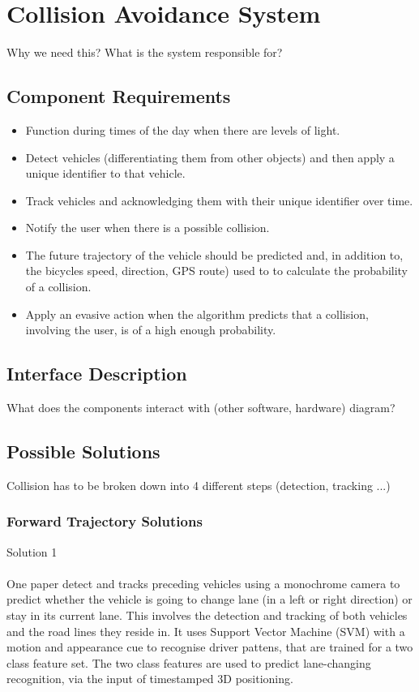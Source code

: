\documentclass[]{report}
\begin{document}
\section{Collision Avoidance System}
Why we need this? What is the system responsible for?
\subsection{Component Requirements}
\begin{itemize}
  \item Function during times of the day when there are levels of light.
  \item Detect vehicles (differentiating them from other objects) and then apply a unique identifier to that vehicle.
  \item Track vehicles and acknowledging them with their unique identifier over time.
  \item Notify the user when there is a possible collision.
  \item The future trajectory of the vehicle should be predicted and, in addition to, the bicycles speed, direction, GPS route) used to to calculate the probability of a collision.
  \item Apply an evasive action when the algorithm predicts that a collision, involving the user, is of a high enough probability. 
\end{itemize}

\subsection{Interface Description} What does the components interact with (other software, hardware) diagram?

\subsection{Possible Solutions} Collision has to be broken down into 4 different steps (detection, tracking ...)

\subsubsection{Forward Trajectory Solutions}

Solution 1

\paragraph {} One paper \citep{multi-cue} detect and tracks preceding vehicles using a monochrome camera to predict whether the vehicle is going to change lane (in a left or right direction) or stay in its current lane. This involves the detection and tracking of both vehicles and the road lines they reside in. It uses Support Vector Machine (SVM) with a motion and appearance cue to recognise driver pattens, that are trained for a two class feature set. The two class features are used to predict lane-changing recognition, via the input of timestamped 3D positioning. 
\end{document}
